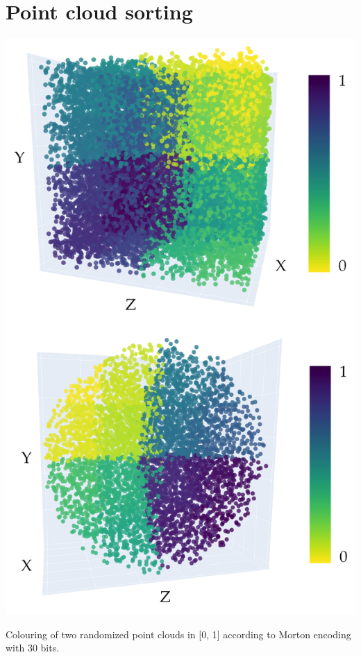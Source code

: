 

\section{Point cloud sorting}

\begin{marginfigure}[1cm]
    \centering
    \includegraphics[width=\linewidth]{figs/multi_thermal_projection/point_cloud_morton.png}
    \caption{Colouring of two randomized point clouds in [0, 1] according to Morton encoding with 30 bits. }
	\label{fig:morton_point_cloud}
\end{marginfigure}

